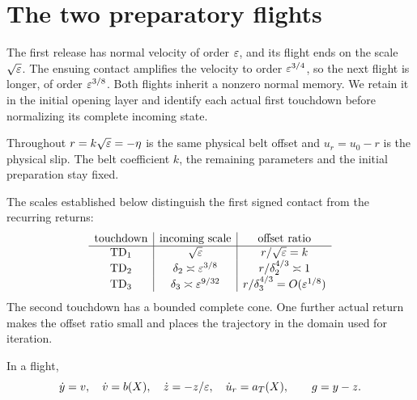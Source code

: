 \section{The two preparatory flights}
\label{sec:preparation}

The first release has normal velocity of order $\varepsilon$, and its flight
ends on the scale $\sqrt{\varepsilon}$. The ensuing contact amplifies the
velocity to order $\varepsilon^{3/4}$, so the next flight is longer, of
order $\varepsilon^{3/8}$. Both flights inherit a nonzero normal memory.
We retain it in the initial opening layer and identify each actual
first touchdown before normalizing its complete incoming state.

Throughout $r=k\sqrt{\varepsilon}=-\eta$ is the same physical belt offset
and $u_r=u_0-r$ is the physical slip. The belt coefficient $k$,
the remaining parameters and the initial preparation stay fixed.

The scales established below distinguish the first signed contact
from the recurring returns:
\[
\begin{array}{c|c|c}
 \text{touchdown}&\text{incoming scale}&\text{offset ratio}\\ \hline
 \mathrm{TD}_1&\sqrt{\varepsilon}&r/\sqrt{\varepsilon}=k\\
 \mathrm{TD}_2&\delta_2\asymp\varepsilon^{3/8}&r/\delta_2^{4/3}\asymp1\\
 \mathrm{TD}_3&\delta_3\asymp\varepsilon^{9/32}&r/\delta_3^{4/3}=O(\varepsilon^{1/8})
\end{array}
\]
The second touchdown has a bounded complete cone. One further actual
return makes the offset ratio small and places the trajectory in the
domain used for iteration.

In a flight,
\begin{equation}
 \dot y=v,\quad\dot v=b(X),\quad\dot z=-z/\varepsilon,
 \quad\dot u_r=a_T(X),\qquad g=y-z.
 \label{prep:free-field}
\end{equation}

